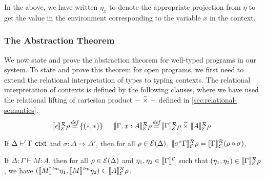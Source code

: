 In the above, we have written $\eta_x$ to denote the appropriate
projection from $\eta$ to get the value in the environment
corresponding to the variable $x$ in the context.

\subsubsection{The Abstraction Theorem}
\label{sec:abstraction-theorem}

We now state and prove the abstraction theorem for well-typed programs
in our system. To state and prove this theorem for open programs, we
first need to extend the relational interpretation of types to typing
contexts. The relational interpretation of contexts is defined by the
following clauses, where we have used the relational lifting of
cartesian product $-\mathrel{\widehat\times}-$ defined in
\autoref{sec:relational-semantics}.
\begin{displaymath}
  \begin{array}{@{}l@{\hspace{0.1em}\isDefinedAs\hspace{0.1em}}l@{\hspace{1.5em}}l@{\hspace{0.1em}\isDefinedAs\hspace{0.1em}}l}
    \rsem{\epsilon}{\relEnv{E}}{\rho} & \{(*,*)\} &
    \rsem{\Gamma, x : A}{\relEnv{E}}{\rho} & \rsem{\Gamma}{\relEnv{E}}\rho \relTimes \rsem{A}{\relEnv{E}}\rho
  \end{array}
\end{displaymath}
\begin{lemma}\label{lem:ctxtsubst-rel}
  If $\Delta \vdash' \Gamma \textsf{ ctxt}$ and $\sigma : \Delta \Rightarrow
  \Delta'$, then for all $\rho \in \mathcal{E}(\Delta)$,
  $\llbracket \sigma^*\Gamma \rrbracket^{\mathcal{R}}_{\mathcal{E}}{\rho} =
  \llbracket \Gamma \rrbracket^{\mathcal{R}}_{\mathcal{E}}{(\rho \circ \sigma)}$.
\end{lemma}

\begin{theorem}[Abstraction]\label{thm:abstraction}
  If $\Delta; \Gamma \vdash M : A$, then for all $\rho \in
  \mathcal{E}(\Delta)$ and $\eta_1, \eta_2 \in \llbracket \Gamma \rrbracket^{\mathcal{C}}$ such
  that $(\eta_1, \eta_2) \in \llbracket \Gamma \rrbracket^{\mathcal{R}}_{\mathcal{E}}{\rho}$, we have
  $(\llbracket M \rrbracket^{\mathit{tm}}\eta_1, \llbracket M \rrbracket^{\mathit{tm}}\eta_2) \in \llbracket A \rrbracket^{\mathcal{R}}_{\mathcal{E}}{\rho}$.
\end{theorem}

